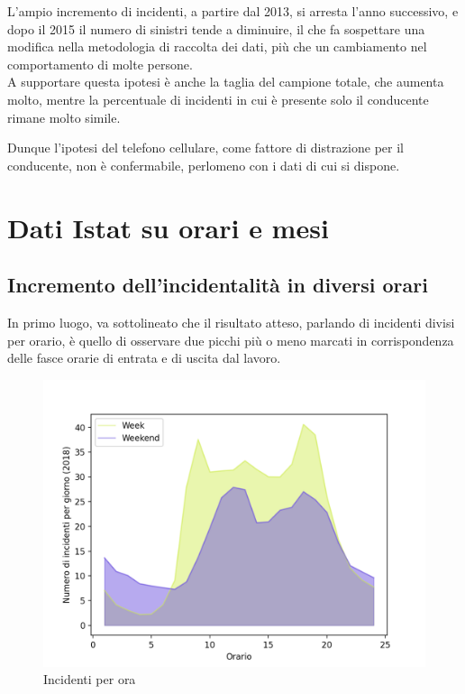 \documentclass[a4paper]{report}
\begin{document}
L'ampio incremento di incidenti, a partire dal 2013, si arresta l'anno successivo, e dopo il 2015 
il numero di sinistri tende a diminuire, il che fa sospettare una modifica nella metodologia 
di raccolta dei dati, più che un cambiamento nel comportamento di molte persone.\\
A supportare questa ipotesi è anche la taglia del campione totale, che aumenta molto, mentre la 
percentuale di incidenti in cui è presente solo il conducente rimane molto simile.

Dunque l'ipotesi del telefono cellulare, come fattore di distrazione per il conducente, 
non è confermabile, perlomeno con i dati di cui si dispone.

\section{Dati Istat su orari e mesi}

\subsection{Incremento dell'incidentalità in diversi orari}

In primo luogo, va sottolineato che il risultato atteso, 
parlando di incidenti divisi per orario, è quello di osservare due picchi più o meno marcati 
in corrispondenza delle fasce orarie di entrata e di uscita dal lavoro.

\begin{figure}
    \includegraphics[width=\linewidth]{../src/incidenti/incidenti_senza_coords/ore_punta/week_weekend.png}
    \caption{Incidenti per ora}
    \label{fig:week-weekend}
\end{figure}
\end{document}
